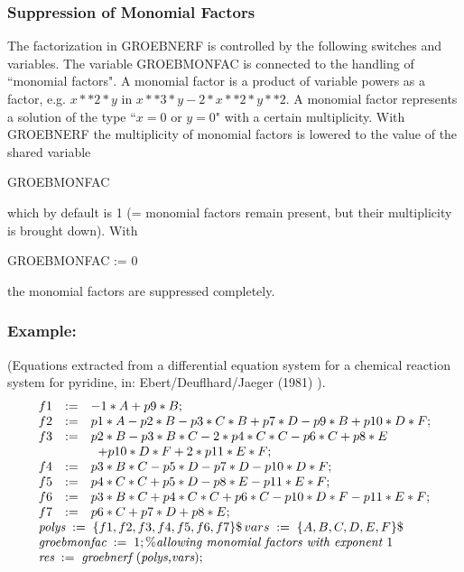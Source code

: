 \subsubsection{Suppression of Monomial Factors}
The factorization in GROEBNERF is controlled by the following
switches and variables.  The variable GROEBMONFAC is connected to
the handling of ``monomial factors".  A monomial factor is a product
of variable powers as a factor, e.g. $ x**2*y$  in  $x**3*y -
2*x**2*y**2$.  A monomial factor represents a solution of the type
``$ x = 0$  or  $y = 0$" with a certain multiplicity.  With
GROEB\-NERF
the multiplicity of monomial factors is lowered to the value of the
shared variable
\begin{center}
GROEBMONFAC
\end{center}
which by default is 1 (= monomial factors remain present, but their
multiplicity is brought down). With
\begin{center}
GROEBMONFAC := 0
\end{center}
the monomial factors are suppressed completely.

\subsubsection*{Example:}
(Equations extracted from a differential equation system for a
chemical reaction system for pyridine, in: {\sc
Ebert/Deuflhard/Jaeger} (1981) \cite{EDJ81}). \[
\begin{array}{lll}
f1 & := & -1*A + p9*B; \\
f2 & := & p1*A - p2*B - p3*C*B + p7*D - p9*B + p10*D*F; \\
f3 & := & p2*B - p3*B*C - 2*p4*C*C - p6*C + p8*E \\
& &  \;\;+ p10*D*F + 2*p11*E*F;\\
f4 & := & p3*B*C - p5*D - p7*D - p10*D*F; \\
f5 & := & p4*C*C + p5*D -p8*E - p11*E*F; \\
f6 & := & p3*B*C + p4*C*C + p6*C - p10*D*F - p11*E*F; \\
f7 & := & p6*C + p7*D + p8*E; \\
\multicolumn{3}{l}{\mbox{\it polys}\; :=\;\{f1,f2,f3,f4,f5,f6,f7\} \$ \,vars\; :
=\;
\{A,B,C,D,E,F\}\$} \\
\multicolumn{3}{l}{\mbox{\it groebmonfac}\; :=\; 1;  \%\mbox{\it
allowing monomial factors with exponent $1$}} \\
\multicolumn{3}{l}{\mbox{\it res} \;:=\; \mbox{\it  groebnerf
$($polys,vars$)$};}
\end{array}
\]

